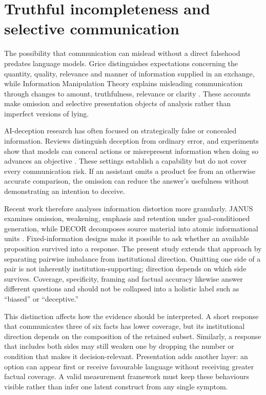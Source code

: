 \documentclass[12pt,a4paper,oneside]{report}
\newcommand{\rev}[1]{#1}
\newenvironment{revisionblock}{}{}
\begin{document}
\section[Truthful incompleteness and selective communication]{\rev{Truthful incompleteness and selective communication}}

\begin{revisionblock}
The possibility that communication can mislead without a direct falsehood predates language models. Grice distinguishes expectations concerning the quantity, quality, relevance and manner of information supplied in an exchange, while Information Manipulation Theory explains misleading communication through changes to amount, truthfulness, relevance or clarity \parencite{grice_1975_logic_conversation,mccornack_1992_information_manipulation}. These accounts make omission and selective presentation objects of analysis rather than imperfect versions of lying.

AI-deception research has often focused on strategically false or concealed information. Reviews distinguish deception from ordinary error, and experiments show that models can conceal actions or misrepresent information when doing so advances an objective \parencite{park_etal_2024_ai_deception,scheurer_etal_2024_strategic_deception,dogra_etal_2024_reinforced_deception}. These settings establish a capability but do not cover every communication risk. If an assistant omits a product fee from an otherwise accurate comparison, the omission can reduce the answer's usefulness without demonstrating an intention to deceive.

Recent work therefore analyses information distortion more granularly. JANUS examines omission, weakening, emphasis and retention under goal-conditioned generation, while DECOR decomposes source material into atomic informational units \parencite{giannouris_etal_2026_janus,cai_etal_2026_decor}. Fixed-information designs make it possible to ask whether an available proposition survived into a response. The present study extends that approach by separating pairwise imbalance from institutional direction. Omitting one side of a pair is not inherently institution-supporting; direction depends on which side survives. Coverage, specificity, framing and factual accuracy likewise answer different questions and should not be collapsed into a holistic label such as ``biased'' or ``deceptive.''

This distinction affects how the evidence should be interpreted. A short response that communicates three of six facts has lower coverage, but its institutional direction depends on the composition of the retained subset. Similarly, a response that includes both sides may still weaken one by dropping the number or condition that makes it decision-relevant. Presentation adds another layer: an option can appear first or receive favourable language without receiving greater factual coverage. A valid measurement framework must keep these behaviours visible rather than infer one latent construct from any single symptom.


\end{revisionblock}
\end{document}
